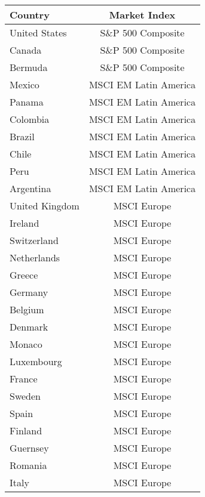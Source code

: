 \documentclass[12pt]{article}
\begin{document}
\begin{table}
    \centering
    \label{tab:mrkt_ind}
    \footnotesize{
        \begin{tabular}{lc}
            \toprule
            Country & Market Index \\
            \midrule 
            United States & S\&P 500 Composite \\
            Canada & S\&P 500 Composite \\
            Bermuda & S\&P 500 Composite \\
        
            Mexico & MSCI EM Latin America  \\
            Panama & MSCI EM Latin America  \\
            Colombia & MSCI EM Latin America  \\
            Brazil & MSCI EM Latin America  \\
            Chile & MSCI EM Latin America  \\
            Peru & MSCI EM Latin America  \\
            Argentina & MSCI EM Latin America  \\
            
            United Kingdom & MSCI Europe  \\
            Ireland & MSCI Europe  \\
            Switzerland & MSCI Europe  \\
            Netherlands & MSCI Europe  \\
            Greece & MSCI Europe  \\
            Germany & MSCI Europe  \\
            Belgium & MSCI Europe  \\
            Denmark & MSCI Europe  \\
            Monaco & MSCI Europe  \\
            Luxembourg & MSCI Europe  \\
            France & MSCI Europe  \\
            Sweden & MSCI Europe  \\
            Spain & MSCI Europe  \\
            Finland & MSCI Europe  \\
            Guernsey & MSCI Europe \\ 
            Romania & MSCI Europe  \\
            Italy & MSCI Europe  \\
            

\end{tabular}}
\end{table}
\end{document}
